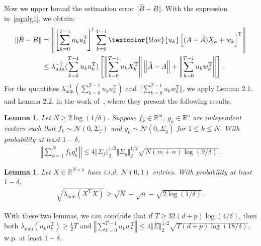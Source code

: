 \documentclass{article}
\newtheorem{lemma}[theorem]{Lemma}
\theoremstyle{definition}
\begin{document}
Now we upper bound the estimation error $\Vert \hat{B}-B\Vert $. With the expression in~\eqref{eq:alg1}, we obtain:
\begin{align*}
\Vert \hat{B}-B\Vert &=\left\Vert\left[\sum_{k=0}^{T-1}u_{k}u^{\mathrm{T}}_{k}\right]^{\dagger}\sum_{k=0}^{T-1}\textcolor{blue}{u_{k}}\left[(A-\hat{A})X_{k}+w_{k}\right]^{\mathrm{T}}\right\Vert\\
&\leq\lambda^{-1}_{\min}(\sum_{k=0}^{T-1}u_{k}u^{\mathrm{T}}_{k})\left[\left\Vert\sum_{k=0}^{T-1}u_{k}X^{\mathrm{T}}_{k}\right\Vert \left\Vert\hat{A}-A\right\Vert+\left\Vert\sum_{k=0}^{T-1}u_{k}w^{\mathrm{T}}_{k}\right\Vert\right]\,.
\end{align*}
For the quantities $\lambda^{-1}_{\min}(\sum_{k=0}^{T-1}u_{k}u^{\mathrm{T}}_{k})$ and $\Vert \sum_{k=0}^{T-1}u_{k}w^{\mathrm{T}}_{k}\Vert $, we apply Lemma 2.1. and Lemma 2.2. in the work of~\citep{ref5}, where they present the following results.
\begin{lemma}
Let $N\geq 2\log(1/\delta)$. Suppose $f_{k}\in\mathbb{R}^{m}$, $g_{k}\in\mathbb{R}^{n}$ are independent vectors such that $f_{k}\sim\mathcal{N}(0,\Sigma_{f})$ and $g_{k}\sim\mathcal{N}(0,\Sigma_{g})$ for $1\leq k\leq N$. With probability at least $1-\delta$,
\begin{align*}
\left\Vert\sum_{k=1}^{N}f_{k}g^{\mathrm{T}}_{k}\right\Vert\leq 4\Vert \Sigma_{f}\Vert ^{1/2}_{2}\Vert \Sigma_{g}\Vert ^{1/2}_{2}\sqrt{N(m+n)\log(9/\delta)}\,.
\end{align*}
\end{lemma}
\begin{lemma}
Let $X\in\mathbb{R}^{N\times n}$ have $i.i.d.$ $\mathcal{N}(0,1)$ entries. With probability at least $1-\delta$,
\begin{align*}
\sqrt{\lambda_{\min}(X^{\mathrm{T}}X)}\geq \sqrt{N}-\sqrt{n}-\sqrt{2\log(1/\delta)}\,.
\end{align*}
\end{lemma}
With these two lemmas, we can conclude that if $T\geq 32(d+p)\log(4/\delta)$, then both
$\lambda_{\min}(u_{k}u^{\mathrm{T}}_{k})\geq\frac{1}{2}T$ and $\left\Vert\sum_{k=0}^{T-1}u_{k}w^{\mathrm{T}}_{k}\right\Vert \leq 4\left\Vert\Sigma\right\Vert^{1/2}_{2}\sqrt{T(d+p)\log(18/\delta)}$, w.p. at least $1-\delta$.
\end{document}
